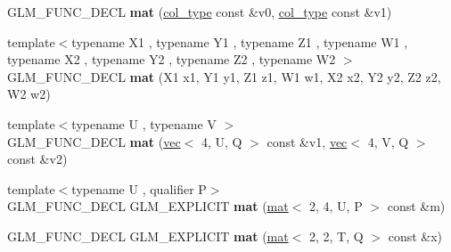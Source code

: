 \begin{DoxyCompactItemize}
\item 
\mbox{\label{structglm_1_1mat_3_012_00_014_00_01T_00_01Q_01_4_a6b1130f1dcd96a6a20d613576e5c31d4}} 
G\+L\+M\+\_\+\+F\+U\+N\+C\+\_\+\+D\+E\+CL {\bfseries mat} (\hyperlink{structglm_1_1vec_3_014_00_01T_00_01Q_01_4}{col\+\_\+type} const \&v0, \hyperlink{structglm_1_1vec_3_014_00_01T_00_01Q_01_4}{col\+\_\+type} const \&v1)
\item 
\mbox{\label{structglm_1_1mat_3_012_00_014_00_01T_00_01Q_01_4_a06023e1b38ae2d1fad10428347c57595}} 
{\footnotesize template$<$typename X1 , typename Y1 , typename Z1 , typename W1 , typename X2 , typename Y2 , typename Z2 , typename W2 $>$ }\\G\+L\+M\+\_\+\+F\+U\+N\+C\+\_\+\+D\+E\+CL {\bfseries mat} (X1 x1, Y1 y1, Z1 z1, W1 w1, X2 x2, Y2 y2, Z2 z2, W2 w2)
\item 
\mbox{\label{structglm_1_1mat_3_012_00_014_00_01T_00_01Q_01_4_a74eb19a0b032f3e2afe79be3011ac7cf}} 
{\footnotesize template$<$typename U , typename V $>$ }\\G\+L\+M\+\_\+\+F\+U\+N\+C\+\_\+\+D\+E\+CL {\bfseries mat} (\hyperlink{structglm_1_1vec}{vec}$<$ 4, U, Q $>$ const \&v1, \hyperlink{structglm_1_1vec}{vec}$<$ 4, V, Q $>$ const \&v2)
\item 
\mbox{\label{structglm_1_1mat_3_012_00_014_00_01T_00_01Q_01_4_ac0222fe6c95fecf230e2458fd890e009}} 
{\footnotesize template$<$typename U , qualifier P$>$ }\\G\+L\+M\+\_\+\+F\+U\+N\+C\+\_\+\+D\+E\+CL G\+L\+M\+\_\+\+E\+X\+P\+L\+I\+C\+IT {\bfseries mat} (\hyperlink{structglm_1_1mat}{mat}$<$ 2, 4, U, P $>$ const \&m)
\item 
\mbox{\label{structglm_1_1mat_3_012_00_014_00_01T_00_01Q_01_4_aeff5a071e7a2b2f6ad5701893878c225}} 
G\+L\+M\+\_\+\+F\+U\+N\+C\+\_\+\+D\+E\+CL G\+L\+M\+\_\+\+E\+X\+P\+L\+I\+C\+IT {\bfseries mat} (\hyperlink{structglm_1_1mat}{mat}$<$ 2, 2, T, Q $>$ const \&x)
\item 
\mbox{\label{structglm_1_1mat_3_012_00_014_00_01T_00_01Q_01_4_af163580ee7bc42a2b94b347d84b183ed}} 

\end{DoxyCompactItemize}
